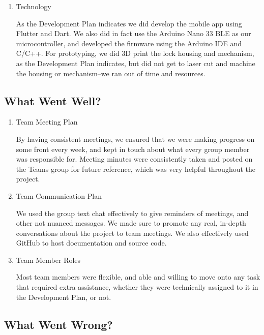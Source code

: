 \documentclass{article}
\begin{document}
\begin{enumerate}
\item{Technology}

As the Development Plan indicates we did develop the mobile app using Flutter and Dart. We also did in fact use the Arduino Nano 33 BLE as our microcontroller, and developed the firmware using the Arduino IDE and C/C++. For prototyping, we did 3D print the lock housing and mechanism, as the Development Plan indicates, but did not get to laser cut and machine the housing or mechanism--we ran out of time and resources. 

\end{enumerate}

\subsection{What Went Well?}


\begin{enumerate}
    \item{Team Meeting Plan}
    
 By having consistent meetings, we ensured that we were making progress on some front every week, and kept in touch about what every group member was responsible for. Meeting minutes were consistently taken and posted on the Teams group for future reference, which was very helpful throughout the project.

    \item{Team Communication Plan}

    We used the group text chat effectively to give reminders of meetings, and other not nuanced messages. We made sure to promote any real, in-depth conversations about the project to team meetings. We also effectively used GitHub to host documentation and source code. 

    \item{Team Member Roles}
    
    Most team members were flexible, and able and willing to move onto any task that required extra assistance, whether they were technically assigned to it in the Development Plan, or not.
    
\end{enumerate}

\subsection{What Went Wrong?}
\end{document}
